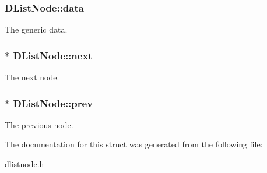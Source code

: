 \subsubsection[{\texorpdfstring{data}{data}}]{ D\+List\+Node\+::data}\hypertarget{structDListNode_aae5a2c880ddfb133d04d97910f356e6b}{}\label{structDListNode_aae5a2c880ddfb133d04d97910f356e6b}
The generic data. 
\subsubsection[{\texorpdfstring{next}{next}}]{$\ast$ D\+List\+Node\+::next}\hypertarget{structDListNode_af9d7a8fe9c70f6836aba009163392fcc}{}\label{structDListNode_af9d7a8fe9c70f6836aba009163392fcc}
The next node. 
\subsubsection[{\texorpdfstring{prev}{prev}}]{$\ast$ D\+List\+Node\+::prev}\hypertarget{structDListNode_af52bb1206b2228c7e47eb5ecd5dbb38d}{}\label{structDListNode_af52bb1206b2228c7e47eb5ecd5dbb38d}
The previous node. 

The documentation for this struct was generated from the following file\+:\begin{DoxyCompactItemize}
\item 
\hyperlink{dlistnode_8h}{dlistnode.\+h}\end{DoxyCompactItemize}
